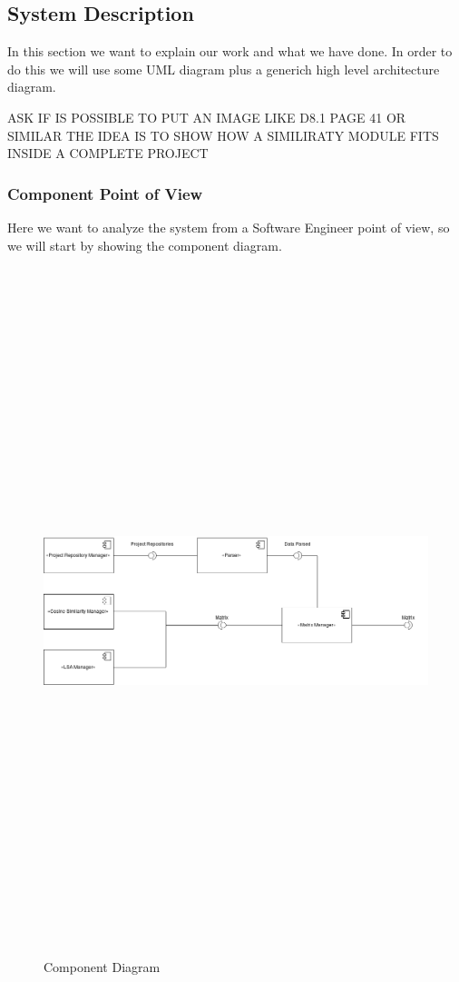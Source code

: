 \subsection{System Description}
In this section we want to explain our work and what we have done. In order to do this we will use some UML diagram plus a generich high level architecture diagram.

ASK IF IS POSSIBLE TO PUT AN IMAGE LIKE D8.1 PAGE 41 OR SIMILAR
THE IDEA IS TO SHOW HOW A SIMILIRATY MODULE FITS INSIDE A COMPLETE PROJECT

\subsubsection{Component Point of View}
Here we want to analyze the system from a Software Engineer point of view, so we will start by showing the component diagram.
\begin{figure}[H]
	\includegraphics[width=15cm,height=20cm,keepaspectratio]{images/ComponentDiagram.png}
	\caption{Component Diagram}
	\label{fig:Component}
\end{figure}

